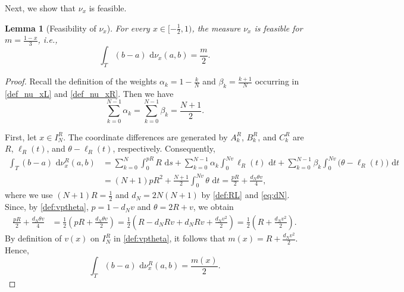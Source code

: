 \documentclass{article}
\newtheorem{lemma}[theorem]{Lemma}
\newcommand{\de}{\mathrm{\,d}}
\begin{document}
Next, we show that \(\nu_x\) is feasible.


\begin{lemma}[Feasibility of \(\nu_x\)]
\label{lem:primal-feasibility}
For every \(x\in[-\frac12,1)\), the measure \(\nu_x\) is feasible for \(m=\frac{1-x}{3}\), i.e.,
\[
    \int_T(b-a)\,\de\nu_x(a,b)=\frac{m}{2}.
\]
\end{lemma}

\begin{proof}
Recall the definition of the weights \(\alpha_k = 1 - \frac k N\) and \(\beta_k = \frac{k+1}{N}\) occurring in \eqref{def_nu_xL} and \eqref{def_nu_xR}.
Then we have
\[
    \sum_{k=0}^{N-1}\alpha_k
    =
    \sum_{k=0}^{N-1}\beta_k
    =
    \frac{N+1}{2}.
\]

First, let \(x\in I_N^R\).
The coordinate differences are generated by \(A_k^R\), \(B_k^R\), and \(C_k^R\) are \(R\), \(\ell_R(t)\), and \(\theta-\ell_R(t)\), respectively.
Consequently,
\begin{align*}
    \int_T(b-a)\,\de\nu_x^R(a,b)
    &=
    \sum_{k=0}^{N}\int_0^{pR}R\,\de s
    +
    \sum_{k=0}^{N-1}\alpha_k
    \int_0^{Nv}\ell_R(t)\,\de t
    +\sum_{k=0}^{N-1}\beta_k
    \int_0^{Nv}\bigl(\theta-\ell_R(t)\bigr)\,\de t\\
    &=
    (N+1)pR^2
    +
    \frac{N+1}{2}
    \int_0^{Nv}\theta\,\de t 
    =
    \frac{pR}{2}
    +
    \frac{d_N\theta v}{4},
\end{align*}
where we use \((N+1)R=\frac12\) and \(d_N=2N(N+1)\) by \eqref{def:RL} and \eqref{eq:dN}.
Since, by \eqref{def:vptheta}, \(p=1-d_Nv\) and \(\theta=2R+v\), we obtain
\begin{align*}
    \frac{pR}{2}+\frac{d_N\theta v}{4}
    &=
    \frac12
    \left(
        pR+\frac{d_N\theta v}{2}
    \right)
    =
    \frac12
    \left(
        R-d_NRv+d_NRv+\frac{d_Nv^2}{2}
    \right)
    =
    \frac12
    \left(
        R+\frac{d_Nv^2}{2}
    \right).
\end{align*}
By definition of \(v(x)\) on \(I_N^R\) in \eqref{def:vptheta}, it follows that \(m(x)=R+\frac{d_Nv^2}{2}\).
Hence,
\[
    \int_T(b-a)\,\de\nu_x^R(a,b)
    =
    \frac{m(x)}{2}.
\]


\end{proof}
\end{document}
